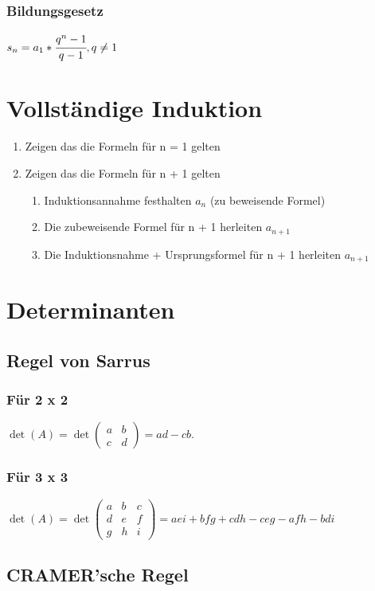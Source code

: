 \documentclass[a4paper,12pt]{scrartcl}
\begin{document}
\subsubsection{Bildungsgesetz}
$s_n = a_1 * \cfrac{q^n - 1}{q - 1}, q \ne 1$

\section{Vollständige Induktion}
\begin{enumerate}
\item Zeigen das die Formeln für n = 1 gelten
\item Zeigen das die Formeln für n + 1 gelten
\begin{enumerate}
\item Induktionsannahme festhalten $a_n$ (zu beweisende Formel)
\item Die zubeweisende Formel für n + 1 herleiten $a_{n+1}$
\item Die Induktionsnahme + Ursprungsformel für n + 1 herleiten $a_{n+1}$
\end{enumerate}
\end{enumerate}

\section{Determinanten}
\subsection{Regel von Sarrus}
\subsubsection{Für 2 x 2}

$
\det(A) = 
\det \begin{pmatrix}
a & b \\ 
c & d 
\end{pmatrix} = ad - cb.
$

\subsubsection{Für 3 x 3}
$ \det(A) = \det
\begin{pmatrix}
  a & b & c \\
  d & e & f \\
  g & h & i
\end{pmatrix} = aei + bfg + cdh - ceg -afh -bdi
$


\subsection{CRAMER'sche Regel}
\end{document}
